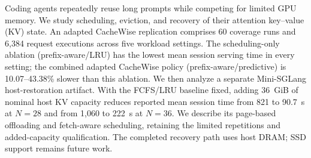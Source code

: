 Coding agents repeatedly reuse long prompts while competing for limited GPU memory.
We study scheduling, eviction, and recovery of their attention key--value (KV) state.
An adapted CacheWise replication comprises 60 coverage runs and 6,384 request executions across five workload settings.
The scheduling-only ablation (prefix-aware/LRU) has the lowest mean session serving time in every setting; the combined adapted CacheWise policy (prefix-aware/predictive) is 10.07--43.38\% slower than this ablation.
We then analyze a separate Mini-SGLang host-restoration artifact.
With the FCFS/LRU baseline fixed, adding 36~GiB of nominal host KV capacity reduces reported mean session time from 821 to 90.7~s at $N=28$ and from 1,060 to 222~s at $N=36$.
We describe its page-based offloading and fetch-aware scheduling, retaining the limited repetitions and added-capacity qualification.
The completed recovery path uses host DRAM; SSD support remains future work.
